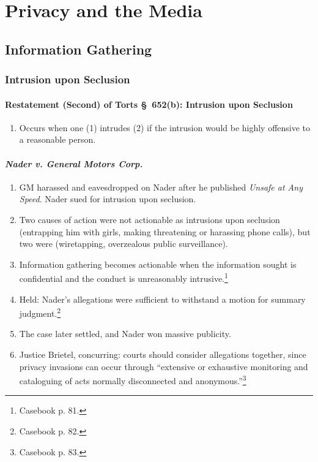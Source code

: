 \section{Privacy and the Media}

\subsection{Information Gathering}

\subsubsection{Intrusion upon Seclusion}

\paragraph{Restatement (Second) of Torts \S\ 652(b): Intrusion upon Seclusion}

\begin{enumerate}
    \item Occurs when one (1) intrudes (2) if the intrusion would be highly 
    offensive to a reasonable person.
\end{enumerate}

\paragraph{\emph{Nader v. General Motors Corp.}}

\begin{enumerate}
    \item GM harassed and eavesdropped on Nader after he published \emph{Unsafe 
    at Any Speed}. Nader sued for intrusion upon seclusion.
    \item Two causes of action were not actionable as intrusions upon seclusion 
    (entrapping him with girls, making threatening or harassing phone calls), 
    but two were (wiretapping, overzealous public surveillance).
    \item Information gathering becomes actionable when the information sought 
    is confidential and the conduct is unreasonably intrusive.\footnote{Casebook 
    p. 81.}
    \item Held: Nader's allegations were sufficient to withstand a motion for 
    summary judgment.\footnote{Casebook p. 82.}
    \item The case later settled, and Nader won massive publicity.
    \item Justice Brietel, concurring: courts should consider allegations 
    together, since privacy invasions can occur through ``extensive or 
    exhaustive monitoring and cataloguing of acts normally disconnected and 
    anonymous.''\footnote{Casebook p. 83.}
\end{enumerate}

